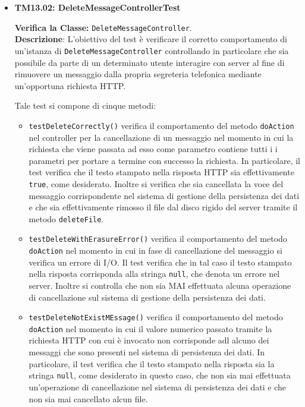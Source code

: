\begin{itemize}
\begin{itemize}
\end{itemize}


\item \textbf{TM13.02: DeleteMessageControllerTest} 

\textbf{Verifica la Classe:} \texttt{DeleteMessageController}.\\
\textbf{Descrizione}: L'obiettivo del test è verificare il corretto comportamento di un'istanza di \texttt{DeleteMessageController} controllando in particolare che sia possibile da parte di un determinato utente interagire con server al fine di rimuovere un messaggio dalla propria segreteria telefonica mediante un'opportuna richiesta HTTP\@.

Tale test si compone di cinque metodi:
\begin{itemize}
\item \texttt{testDeleteCorrectly()} verifica il comportamento del metodo \texttt{doAction} nel controller per la cancellazione di un messaggio nel momento in cui la richiesta che viene passata ad esso come parametro contiene tutti i i parametri per portare a termine con successo la richiesta. In particolare, il test verifica che il testo stampato nella risposta HTTP sia effettivamente \texttt{true}, come desiderato. Inoltre si verifica che sia cancellata la voce del messaggio corrispondente nel sistema di gestione della persistenza dei dati e che sia effettivamente rimosso il file dal disco rigido del server tramite il metodo \texttt{deleteFile}.

\item \texttt{testDeleteWithErasureError()} verifica il comportamento del metodo \texttt{doAction} nel momento in cui in fase di cancellazione del messaggio si verifica un errore di I/O. Il test verifica che in tal caso il testo stampato nella risposta corrisponda alla stringa \texttt{null}, che denota un errore nel server. Inoltre si controlla che non sia MAI effettuata alcuna operazione di cancellazione sul sistema di gestione della persistenza dei dati.

\item \texttt{testDeleteNotExistMEssage()} verifica il comportamento del metodo \texttt{doAction} nel momento in cui il valore numerico passato tramite la richiesta HTTP con cui è invocato non corrisponde adl alcuno dei messaggi che sono presenti nel sistema di persistenza dei dati. In particolare, il test verifica che il testo stampato nella risposta sia la stringa \texttt{null}, come desiderato in questo caso, che non sia mai effettuata un'operazione di cancellazione nel sistema di persistenza dei dati e che non sia mai cancellato alcun file.


\end{itemize}
\end{itemize}
